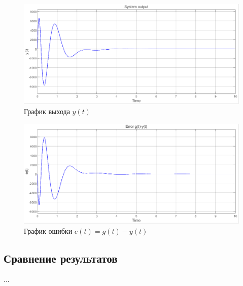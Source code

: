 \documentclass[a4paper, 12pt]{article}
\begin{document}
    \begin{figure}[H]
        \centering
        \includegraphics[scale=0.6]{2task_y.png}
        \captionsetup{skip=0pt}
        \caption{График выхода $y(t)$}
        \label{fig:2task_y}
    \end{figure}
    \begin{figure}[H]
        \centering
        \includegraphics[scale=0.6]{2task_ey.png}
        \captionsetup{skip=0pt}
        \caption{График ошибки $e(t)=g(t)-y(t)$}
        \label{fig:2task_ey}
    \end{figure}


    \subsection{Сравнение результатов}
    ...
\end{document}
